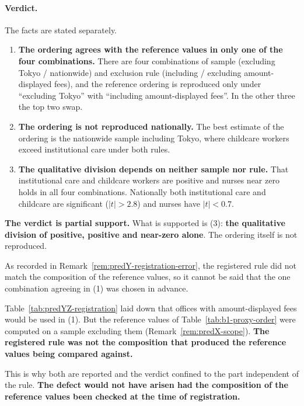 \paragraph{Verdict.}
The facts are stated separately.

\begin{enumerate}[label=(\arabic*)]
\item \textbf{The ordering agrees with the reference values in only one of the four
combinations.} There are four combinations of sample (excluding Tokyo / nationwide) and exclusion
rule (including / excluding amount-displayed fees), and the reference ordering is reproduced only
under ``excluding Tokyo'' with ``including amount-displayed fees''. In the other three the top two
swap.

\item \textbf{The ordering is not reproduced nationally.} The best estimate of the ordering is the
nationwide sample including Tokyo, where childcare workers exceed institutional care under both
rules.

\item \textbf{The qualitative division depends on neither sample nor rule.} That institutional
care and childcare workers are positive and nurses near zero holds in all four combinations.
Nationally both institutional care and childcare are significant ($|t|>2.8$) and nurses have
$|t|<0.7$.
\end{enumerate}

\textbf{The verdict is partial support.} What is supported is (3): \textbf{the qualitative
division of positive, positive and near-zero alone}. The ordering itself is not reproduced.

As recorded in Remark~\ref{rem:predY-registration-error}, the registered rule did not match the
composition of the reference values, so it cannot be said that the one combination agreeing in (1)
was chosen in advance.

\begin{remark}
\label{rem:predY-registration-error}
Table~\ref{tab:predYZ-registration} laid down that offices with amount-displayed fees would be
used in (1). But the reference values of Table~\ref{tab:b1-proxy-order} were computed on a sample
excluding them (Remark~\ref{rem:predX-scope}). \textbf{The registered rule was not the composition
that produced the reference values being compared against.}

This is why both are reported and the verdict confined to the part independent of the rule.
\textbf{The defect would not have arisen had the composition of the reference values been checked
at the time of registration.}
\end{remark}

